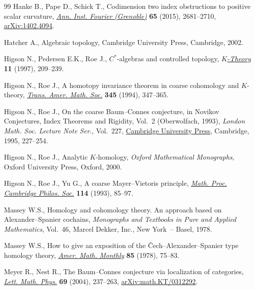 \documentclass[pdftex]{sigma}
\numberwithin{equation}{section}
\theoremstyle{definition}
\begin{document}
\begin{thebibliography}{99}
Hanke B., Pape D., Schick T., Codimension two index obstructions to positive
 scalar curvature, \href{https://doi.org/10.5802/aif.3000}{\textit{Ann. Inst. Fourier (Grenoble)}} \textbf{65} (2015),
 2681--2710, \href{https://arxiv.org/abs/1402.4094}{arXiv:1402.4094}.

Hatcher A., Algebraic topology, Cambridge University Press, Cambridge, 2002.

Higson N., Pedersen E.K., Roe J., {$C^\ast$}-algebras and controlled topology,
 \href{https://doi.org/10.1023/A:1007705726771}{\textit{$K$-Theory}} \textbf{11} (1997), 209--239.

Higson N., Roe J., A homotopy invariance theorem in coarse cohomology and
 {$K$}-theory, \href{https://doi.org/10.2307/2154607}{\textit{Trans. Amer. Math. Soc.}} \textbf{345} (1994), 347--365.

Higson N., Roe J., On the coarse {B}aum--{C}onnes conjecture, in Novikov
 Conjectures, Index Theorems and Rigidity, {V}ol.~2 ({O}berwolfach, 1993),
 \textit{London Math. Soc. Lecture Note Ser.}, Vol.~227, \href{https://doi.org/10.1017/CBO9780511629365.008}{Cambridge University
 Press}, Cambridge, 1995, 227--254.

Higson N., Roe J., Analytic {$K$}-homology, \textit{Oxford Mathematical Monographs},
 Oxford University Press, Oxford, 2000.

Higson N., Roe J., Yu G., A coarse {M}ayer--{V}ietoris principle, \href{https://doi.org/10.1017/S0305004100071425}{\textit{Math.
 Proc. Cambridge Philos. Soc.}} \textbf{114} (1993), 85--97.

Massey W.S., Homology and cohomology theory. An approach based on
 Alexander--Spanier cochains, \textit{Monographs and Textbooks in Pure and
 Applied Mathematics}, Vol.~46, Marcel Dekker, Inc., New York~-- Basel, 1978.

Massey W.S., How to give an exposition of the \v{C}ech--{A}lexander--{S}panier
 type homology theory, \href{https://doi.org/10.2307/2321782}{\textit{Amer. Math. Monthly}} \textbf{85} (1978),
 75--83.

Meyer R., Nest R., The {B}aum--{C}onnes conjecture via localization of
 categories, \href{https://doi.org/10.1007/s11005-004-1831-z}{\textit{Lett. Math. Phys.}} \textbf{69} (2004), 237--263,
 \href{https://arxiv.org/abs/math.KT/0312292}{arXiv:math.KT/0312292}.


\end{thebibliography}
\end{document}
